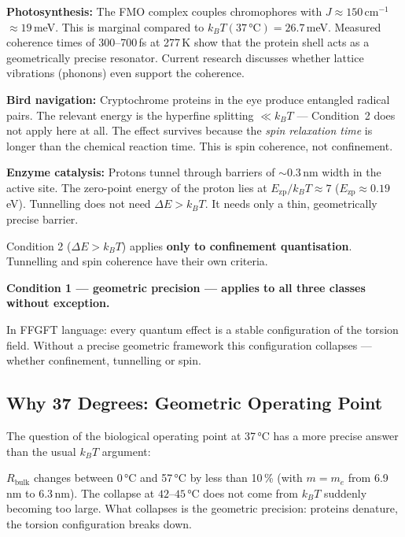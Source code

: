 \textbf{Photosynthesis:}
The FMO complex couples chromophores with $J \approx 150$\,cm$^{-1}$
$\approx 19$\,meV. This is marginal compared to $k_BT(37\,°\text{C})
= 26.7$\,meV. Measured coherence times of 300--700\,fs at 277\,K
show that the protein shell acts as a geometrically precise resonator.
Current research discusses whether lattice vibrations
(phonons) even support the coherence.

\textbf{Bird navigation:}
Cryptochrome proteins in the eye produce entangled radical pairs.
The relevant energy is the hyperfine splitting $\ll k_BT$ ---
Condition~2 does not apply here at all. The effect survives because
the \emph{spin relaxation time} is longer than the chemical
reaction time. This is spin coherence, not confinement.

\textbf{Enzyme catalysis:}
Protons tunnel through barriers of $\sim 0.3$\,nm width
in the active site. The zero-point energy of the proton lies at
$E_\text{zp}/k_BT \approx 7$ ($E_\text{zp} \approx 0.19$\,eV).
Tunnelling does not need $\Delta E > k_BT$. It needs only
a thin, geometrically precise barrier.

\begin{foundation}
Condition 2 ($\Delta E > k_BT$) applies \textbf{only to confinement quantisation}.
Tunnelling and spin coherence have their own criteria.

\textbf{Condition 1 --- geometric precision --- applies to all three classes
without exception.}

In FFGFT language: every quantum effect is a stable configuration
of the torsion field. Without a precise geometric framework this
configuration collapses --- whether confinement, tunnelling or spin.
\end{foundation}

\subsection{Why 37 Degrees: Geometric Operating Point}

The question of the biological operating point at 37\,°C
has a more precise answer than the usual $k_BT$ argument:

$R_{\text{bulk}}$ changes between 0\,°C and 57\,°C
by less than 10\,\% (with $m = m_e$ from 6.9\,nm to 6.3\,nm).
The collapse at $42$--$45\,°\text{C}$ does not come from
$k_BT$ suddenly becoming too large. What collapses is
the geometric precision: proteins denature,
the torsion configuration breaks down.

